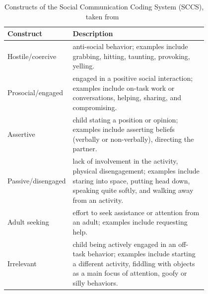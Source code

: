 \documentclass{article}
\begin{document}
\begin{table}[]
\centering
\caption{Constructs of the Social Communication Coding System (SCCS), taken from~\cite{olswang2006reliability}}
\label{table|sccs}
\renewcommand{\arraystretch}{1.8}
\begin{tabular}{@{}lp{0.8\linewidth}@{}}
\toprule
\bf Construct          & \bf Description                                                                                                                                                                                                                                                                                                                                           \\ \midrule
Hostile/coercive   & anti-social behavior; examples include grabbing, hitting, taunting, provoking, yelling.                                                       \\
Prosocial/engaged  & engaged in a positive social interaction; examples include on-task work or conversations, helping, sharing, and compromising.                 \\
Assertive          & child stating a position or opinion; examples include asserting beliefs (verbally or non-verbally), directing the partner.                     \\
Passive/disengaged & lack of involvement in the activity, physical disengagement; examples include staring into space, putting head down, speaking quite softly, and walking away from an activity.\\
Adult seeking      & effort to seek assistance or attention from an adult; examples include requesting help.                                                       \\
Irrelevant         & child being actively engaged in an off-task behavior; examples include starting a different activity, fiddling with objects as a main focus of attention, goofy or silly behaviors. \\ \bottomrule
\end{tabular}
\end{table}
\end{document}
